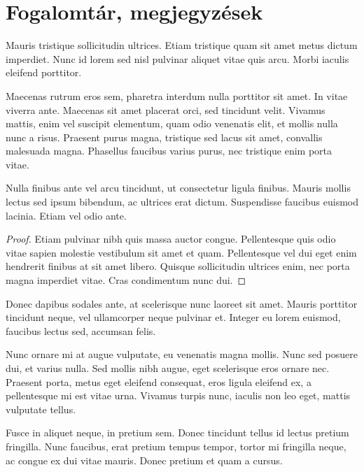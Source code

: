 \section{Fogalomtár, megjegyzések} %

\begin{definition}
Mauris tristique sollicitudin ultrices. Etiam tristique quam sit amet metus dictum imperdiet. Nunc id lorem sed nisl pulvinar aliquet vitae quis arcu. Morbi iaculis eleifend porttitor.
\end{definition}

Maecenas rutrum eros sem, pharetra interdum nulla porttitor sit amet. In vitae viverra ante. Maecenas sit amet placerat orci, sed tincidunt velit. Vivamus mattis, enim vel suscipit elementum, quam odio venenatis elit, et mollis nulla nunc a risus. Praesent purus magna, tristique sed lacus sit amet, convallis malesuada magna. Phasellus faucibus varius purus, nec tristique enim porta vitae.

\begin{theorem}
Nulla finibus ante vel arcu tincidunt, ut consectetur ligula finibus. Mauris mollis lectus sed ipsum bibendum, ac ultrices erat dictum. Suspendisse faucibus euismod lacinia. Etiam vel odio ante.
\end{theorem}
\begin{proof}
Etiam pulvinar nibh quis massa auctor congue. Pellentesque quis odio vitae sapien molestie vestibulum sit amet et quam. Pellentesque vel dui eget enim hendrerit finibus at sit amet libero. Quisque sollicitudin ultrices enim, nec porta magna imperdiet vitae. Cras condimentum nunc dui.
\end{proof}

Donec dapibus sodales ante, at scelerisque nunc laoreet sit amet. Mauris porttitor tincidunt neque, vel ullamcorper neque pulvinar et. Integer eu lorem euismod, faucibus lectus sed, accumsan felis. 

\begin{remark}
Nunc ornare mi at augue vulputate, eu venenatis magna mollis. Nunc sed posuere dui, et varius nulla. Sed mollis nibh augue, eget scelerisque eros ornare nec. Praesent porta, metus eget eleifend consequat, eros ligula eleifend ex, a pellentesque mi est vitae urna. Vivamus turpis nunc, iaculis non leo eget, mattis vulputate tellus.
\end{remark}

Fusce in aliquet neque, in pretium sem. Donec tincidunt tellus id lectus pretium fringilla. Nunc faucibus, erat pretium tempus tempor, tortor mi fringilla neque, ac congue ex dui vitae mauris. Donec pretium et quam a cursus.

